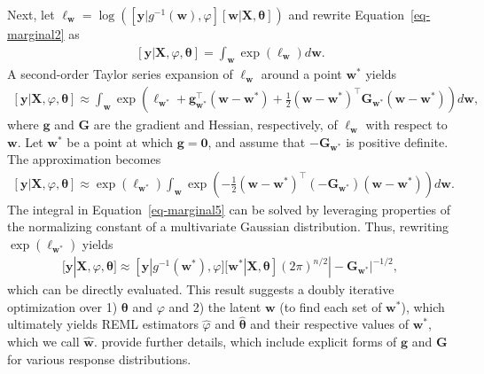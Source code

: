 \documentclass[
]{jss}
\begin{document}
Next, let
\(\ell_\mathbf{w} = \log([\mathbf{y} | g^{-1}(\mathbf{w}), \varphi] [\mathbf{w} | \mathbf{X}, \boldsymbol{\theta}])\)
and rewrite Equation~\ref{eq-marginal2} as
\begin{align}\label{eq-marginal3}
  [\mathbf{y}|\mathbf{X}, \varphi, \boldsymbol{\theta}] = \int_{\mathbf{w}} \exp(\ell_\mathbf{w}) d\mathbf{w}.
\end{align} A second-order Taylor series expansion of
\(\ell_\mathbf{w}\) around a point \(\mathbf{w}^{*}\) yields
\begin{align}\label{eq-marginal4}
  [\mathbf{y}|\mathbf{X}, \varphi, \boldsymbol{\theta}] \approx \int_{\mathbf{w}} \exp(\ell_{\mathbf{w}^{*}} + \mathbf{g}_{\mathbf{w}^{*}}^\top(\mathbf{w} - \mathbf{w}^{*}) + \frac{1}{2}(\mathbf{w} - \mathbf{w}^{*})^\top \mathbf{G}_{\mathbf{w}^{*}} (\mathbf{w} - \mathbf{w}^{*}))d\mathbf{w},
\end{align} where \(\mathbf{g}\) and \(\mathbf{G}\) are the gradient and
Hessian, respectively, of \(\ell_\mathbf{w}\) with respect to
\(\mathbf{w}\). Let \(\mathbf{w}^{*}\) be a point at which
\(\mathbf{g} = \mathbf{0}\), and assume that
\(-\mathbf{G}_{\mathbf{w}^{*}}\) is positive definite. The approximation
becomes \begin{align}\label{eq-marginal5}
  [\mathbf{y}|\mathbf{X}, \varphi, \boldsymbol{\theta}] \approx \exp(\ell_{\mathbf{w}^{*}}) \int_{\mathbf{w}} \exp(-\frac{1}{2}(\mathbf{w} - \mathbf{w}^{*})^\top (-\mathbf{G}_{\mathbf{w}^{*}}) (\mathbf{w} - \mathbf{w}^{*}))d\mathbf{w}.
\end{align} The integral in Equation~\ref{eq-marginal5} can be solved by
leveraging properties of the normalizing constant of a multivariate
Gaussian distribution. Thus, rewriting \(\exp(\ell_{\mathbf{w}^{*}})\)
yields \begin{align}\label{eq-marginal6}
  [\mathbf{y}|\mathbf{X}, \varphi, \boldsymbol{\theta}] \approx [\mathbf{y} | g^{-1}(\mathbf{w}^{*}), \varphi] [\mathbf{w}^{*} | \mathbf{X}, \boldsymbol{\theta}] (2 \pi)^{n/2}|-\mathbf{G}_{\mathbf{w}^{*}}|^{-1/2},
\end{align} which can be directly evaluated. This result suggests a
doubly iterative optimization over 1) \(\boldsymbol{\theta}\) and
\(\varphi\) and 2) the latent \(\mathbf{w}\) (to find each set of
\(\mathbf{w}^{*}\)), which ultimately yields REML estimators
\(\hat{\varphi}\) and \(\hat{\boldsymbol{\theta}}\) and their respective
values of \(\mathbf{w}^{*}\), which we call \(\hat{\mathbf{w}}\).
\citet{ver2024marginal} provide further details, which include explicit
forms of \(\mathbf{g}\) and \(\mathbf{G}\) for various response
distributions.
\end{document}
